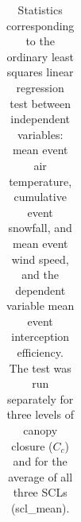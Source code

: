 \documentclass[
  letterpaper,
  DIV=11,
  numbers=noendperiod]{scrartcl}
\begin{document}
\begin{longtable}[]{@{}
  >{\raggedright\arraybackslash}p{}
  >{\raggedright\arraybackslash}p{}
  >{\raggedright\arraybackslash}p{}
  >{\raggedleft\arraybackslash}p{}
  >{\raggedleft\arraybackslash}p{}
  >{\raggedleft\arraybackslash}p{}@{}}

\caption{\label{tbl-lysimeter-event-stats}Statistics corresponding to
the ordinary least squares linear regression test between independent
variables: mean event air temperature, cumulative event snowfall, and
mean event wind speed, and the dependent variable mean event
interception efficiency. The test was run separately for three levels of
canopy closure (\(C_c\)) and for the average of all three SCLs
(scl\_mean).}

\tabularnewline


\end{longtable}
\end{document}
